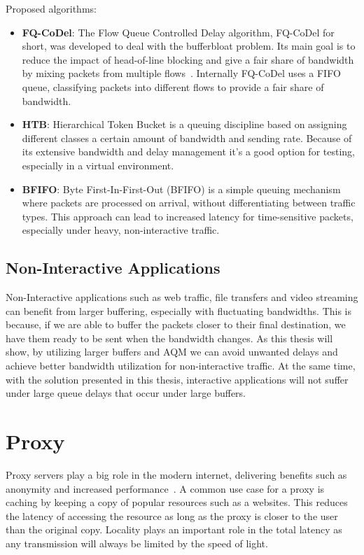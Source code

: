 \documentclass[a4paper,english, 12pt]{report}
\begin{document}
Proposed algorithms:
\begin{itemize}
  \item \textbf{FQ-CoDel}: The Flow Queue Controlled Delay algorithm, FQ-CoDel for short, was developed to deal with the bufferbloat problem. Its main goal is to reduce the impact of head-of-line blocking and give a fair share of bandwidth by mixing packets from multiple flows~\cite{fq_codel_rfc}. Internally FQ-CoDel uses a FIFO queue, classifying packets into different flows to provide a fair share of bandwidth.
  \item \textbf{HTB}: Hierarchical Token Bucket is a queuing discipline based on assigning different classes a certain amount of bandwidth and sending rate. Because of its extensive bandwidth and delay management it's a good option for testing, especially in a virtual environment.
  \item \textbf{BFIFO}: Byte First-In-First-Out (BFIFO) is a simple queuing mechanism where packets are processed on arrival, without differentiating between traffic types. This approach can lead to increased latency for time-sensitive packets, especially under heavy, non-interactive traffic.
\end{itemize}

\subsection{Non-Interactive Applications}
Non-Interactive applications such as web traffic, file transfers and video streaming can benefit from larger buffering, especially with fluctuating bandwidths. This is because, if we are able to buffer the packets closer to their final destination, we have them ready to be sent when the bandwidth changes. As this thesis will show, by utilizing larger buffers and AQM we can avoid unwanted delays and achieve better bandwidth utilization for non-interactive traffic. At the same time, with the solution presented in this thesis, interactive applications will not suffer under large queue delays that occur under large buffers.

\section{Proxy}
Proxy servers play a big role in the modern internet, delivering benefits such as anonymity and increased performance~\cite{nextgen_proxy_servers}. A common use case for a proxy is caching by keeping a copy of popular resources such as a websites. This reduces the latency of accessing the resource as long as the proxy is closer to the user than the original copy. Locality plays an important role in the total latency as any transmission will always be limited by the speed of light.\\
\end{document}
